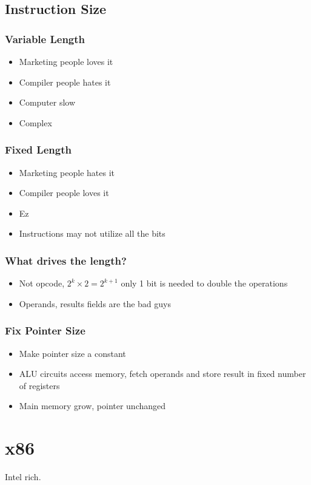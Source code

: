 \documentclass[11pt]{article}
\begin{document}
\subsection{Instruction Size}
\label{sec:org9e623a1}

\subsubsection{Variable Length}
\label{sec:orgaf7025a}

\begin{itemize}
\item Marketing people loves it
\item Compiler people hates it
\item Computer slow
\item Complex
\end{itemize}

\subsubsection{Fixed Length}
\label{sec:orgc09d553}

\begin{itemize}
\item Marketing people hates it
\item Compiler people loves it
\item Ez
\item Instructions may not utilize all the bits
\end{itemize}

\subsubsection{What drives the length?}
\label{sec:org8e6779a}

\begin{itemize}
\item Not opcode, \(2^k \times 2 = 2^{k+1}\) only 1 bit is needed to double the operations
\item Operands, results fields are the bad guys
\end{itemize}

\subsubsection{Fix Pointer Size}
\label{sec:orge8639a0}

\begin{itemize}
\item Make pointer size a constant
\item ALU circuits access memory, fetch operands and store result in fixed number of registers
\item Main memory grow, pointer unchanged
\end{itemize}

\section{x86}
\label{sec:orgb5b1ca9}

Intel rich.
\end{document}
